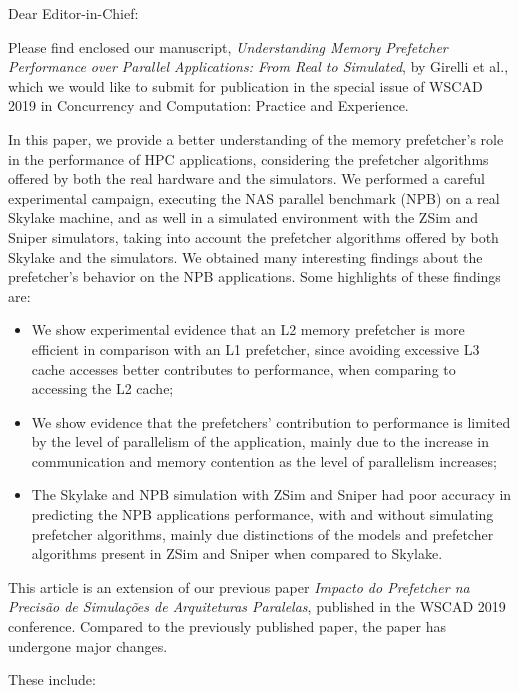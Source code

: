 \documentclass{letter}
\begin{document}
\begin{letter}{}

\opening{Dear Editor-in-Chief:}

Please find enclosed our manuscript, \emph{Understanding Memory Prefetcher Performance over Parallel Applications: From Real to Simulated}, by Girelli et al., which we would like to submit for publication in the special issue of WSCAD 2019 in Concurrency and Computation: Practice and Experience.

In this paper, we provide a better understanding of the memory prefetcher's role in the performance of HPC applications, considering the prefetcher algorithms offered by both the real hardware and the simulators. We performed a careful experimental campaign, executing the NAS parallel benchmark (NPB) on a real Skylake machine, and as well in a simulated environment with the ZSim and Sniper simulators, taking into account the prefetcher algorithms offered by both Skylake and the simulators.
We obtained many interesting findings about the prefetcher's behavior on the NPB applications. Some highlights of these findings are: 

\begin{itemize}
    \item We show experimental evidence that an L2 memory prefetcher is more efficient in comparison with an L1 prefetcher, since avoiding excessive L3 cache accesses better contributes to performance, when comparing to accessing the L2 cache;
    \item We show evidence that the prefetchers' contribution to performance is limited by the level of parallelism of the application, mainly due to the increase in communication and memory contention as the level of parallelism increases;
    \item The Skylake and NPB simulation with ZSim and Sniper had poor accuracy in predicting the NPB applications performance, with and without simulating prefetcher algorithms, mainly due distinctions of the models and prefetcher algorithms present in ZSim and Sniper when compared to Skylake.
\end{itemize}

This article is an extension of our previous paper \emph{Impacto do Prefetcher na Precisão de Simulações de Arquiteturas Paralelas}, published in the WSCAD 2019 conference. Compared to the previously published paper, the paper has undergone major changes. 

These include:

\begin{itemize}


\end{itemize}
\end{letter}
\end{document}
